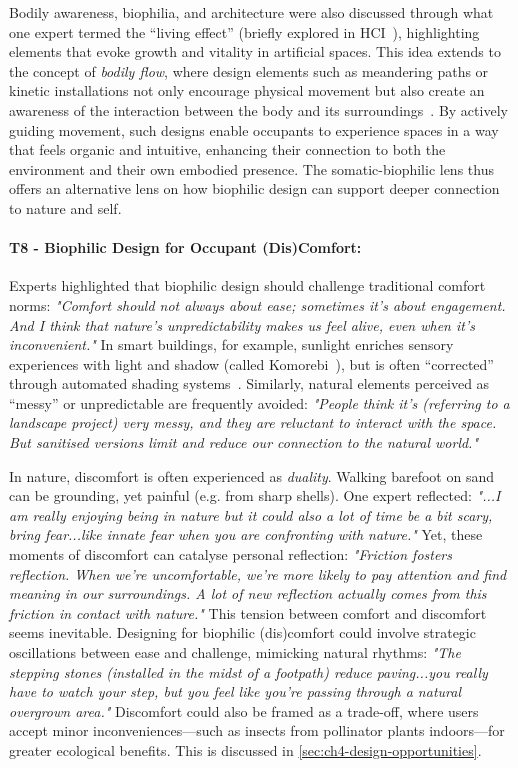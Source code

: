 Bodily awareness, biophilia, and architecture were also discussed through what one expert termed the ``living effect'' (briefly explored in HCI~\cite{steer2015growth}), highlighting elements that evoke growth and vitality in artificial spaces. This idea extends to the concept of \emph{bodily flow}, where design elements such as meandering paths or kinetic installations not only encourage physical movement but also create an awareness of the  interaction between the body and its surroundings~\cite{shusterman2011somaesthetics, cheng2022sonification}. By actively guiding movement, such designs enable occupants to experience spaces in a way that feels organic and intuitive, enhancing their connection to both the environment and their own embodied presence. The somatic-biophilic lens thus offers an alternative lens on how biophilic design can support deeper connection to nature and self.

\paragraph{T8 - Biophilic Design for Occupant (Dis)Comfort:}
\label{theme:t8}

Experts highlighted that biophilic design should challenge traditional comfort norms: \textit{"Comfort should not always about ease; sometimes it's about engagement. And I think that nature's unpredictability makes us feel alive, even when it's inconvenient."} In smart buildings, for example, sunlight enriches sensory experiences with light and shadow (called Komorebi~\cite{zhang2020komorebi}), but is often ``corrected'' through automated shading systems~\cite{casini2018active}. Similarly, natural elements perceived as ``messy'' or unpredictable are frequently avoided: \textit{"People think it's (referring to a landscape project) very messy, and they are reluctant to interact with the space. But sanitised versions limit and reduce our connection to the natural world."}

In nature, discomfort is often experienced as \emph{duality}. Walking barefoot on sand can be grounding, yet painful (e.g. from sharp shells). One expert reflected: \textit{"...I am really enjoying being in nature but it could also a lot of time be a bit scary, bring fear...like innate fear when you are confronting with nature."}  Yet, these moments of discomfort can catalyse personal reflection: \textit{"Friction fosters reflection. When we're uncomfortable, we're more likely to pay attention and find meaning in our surroundings. A lot of new reflection actually comes from this friction in contact with nature."} This tension between comfort and discomfort seems inevitable. Designing for biophilic (dis)comfort could involve strategic oscillations between ease and challenge, mimicking natural rhythms: \textit{"The stepping stones (installed in the midst of a footpath) reduce paving...you really have to watch your step, but you feel like you’re passing through a natural overgrown area."} Discomfort could also be framed as a trade-off, where users accept minor inconveniences---such as insects from pollinator plants indoors---for greater ecological benefits. This is discussed in \autoref{sec:ch4-design-opportunities}. 

